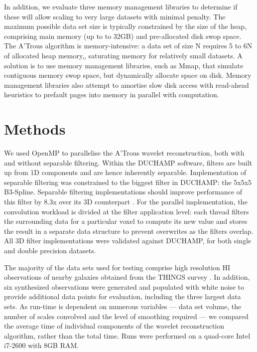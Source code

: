 In addition, we evaluate three memory management libraries to determine if these will allow scaling to very large datasets with minimal penalty.
The maximum possible data set size is typically constrained by the size of the heap, comprising main memory (up to to 32GB) and pre-allocated disk swop space.  The A'Trous algorithm is memory-intensive: a data set of size N requires 5 to 6N of allocated heap memory,, saturating memory for relatively small datasets.
A solution  is to use memory management libraries, such as Mmap\citep{mmap2012},
that simulate contiguous memory swop space, but dynamically allocate space on disk.
Memory management libraries also attempt to amortise slow disk access with read-ahead heuristics to prefault pages into memory in parallel with computation.

\section{Methods}

We used OpenMP to parallelise the  A'Trous wavelet reconstruction, both with and without separable filtering.  Within the DUCHAMP software, filters are built up from 1D components and are hence inherently separable.  Implementation of separable filtering was constrained to the biggest filter in DUCHAMP: the  5x5x5 B3-Spline.
Separable filtering implementations should  improve performance of this filter by 8.3x over its 3D counterpart \citep{Solomon2010}.
For the parallel implementation, the convolution workload is divided at the filter application level: each  thread filters the surrounding data for a particular voxel to compute its new value and stores the result in
a separate data structure to prevent overwrites as the filters overlap.  All  3D filter implementations were validated against  DUCHAMP, for both single and double precision datasets.

The majority of the data sets used for testing comprise high resolution HI observations of nearby galaxies obtained from the THINGS survey \citep{Walter2008}.
In addition, six synthesized observations were generated and populated with white noise to provide additional data points for evaluation, including the three largest data sets. As run-time is dependent on numerous variables ---  data set volume, the number of scales convolved  and the level of smoothing required ---
we compared the average time of  individual components of the wavelet reconstruction algorithm, rather than the total time.  Runs were performed on a quad-core Intel i7-2600 with 8GB RAM.


